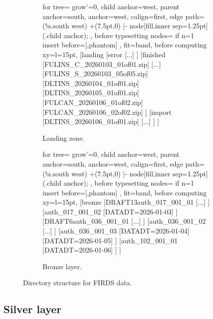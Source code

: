 \begin{figure}[h]
	\centering
	\begin{subfigure}[t]{0.48\textwidth}
		\centering
		\begin{forest}
			for tree={
				grow'=0,
				child anchor=west,
				parent anchor=south,
				anchor=west,
				calign=first,
				edge path={
					\noexpand{}
					(!u.south west) +(7.5pt,0) |- node[fill,inner sep=1.25pt] {} (.child anchor);
				},
				before typesetting nodes={
					if n=1
					{insert before={[,phantom]}}
					{}
				},
				fit=band,
				before computing xy={l=15pt},
			}
			[landing
				[error
					[...]
				]
				[finished
					[FULINS\_C\_20260103\_01of01.zip]
					[...]
					[FULINS\_S\_20260103\_05of05.zip]
					[DLTINS\_20260104\_01of01.zip]
					[DLTINS\_20260105\_01of01.zip]
					[FULCAN\_20260106\_01of02.zip]
					[FULCAN\_20260106\_02of02.zip]
				]
				[import
					[DLTINS\_20260106\_01of01.zip]
					[...]
				]
			]
		\end{forest}
		\caption{Landing zone.}
	\end{subfigure}
	\begin{subfigure}[t]{0.48\textwidth}
		\centering
		\begin{forest}
			for tree={
				grow'=0,
				child anchor=west,
				parent anchor=south,
				anchor=west,
				calign=first,
				edge path={
					\noexpand{}
					(!u.south west) +(7.5pt,0) |- node[fill,inner sep=1.25pt] {} (.child anchor)\forestoption{edge label};
				},
				before typesetting nodes={
					if n=1
					{insert before={[,phantom]}}
					{}
				},
				fit=band,
				before computing xy={l=15pt},
			}
			[bronze
				[DRAFT13auth\_017\_001\_01
					[...]
				]
				[auth\_017\_001\_02
					[{DATADT=2026-01-03}]
				]
				[DRAFT6auth\_036\_001\_01
					[...]
				]
				[auth\_036\_001\_02
					[...]
				]
				[auth\_036\_001\_03
					[{DATADT=2026-01-04}]
					[{DATADT=2026-01-05}]
				]
				[auth\_102\_001\_01
					[{DATADT=2026-01-06}]
				]
			]
		\end{forest}
		\caption{Bronze layer.}
	\end{subfigure}
	\caption{Directory structure for FIRDS data.\label{fig:dirstruct_firds_landing_bronze}}
\end{figure}


\subsection{Silver layer\label{sec:firds-silver}}

